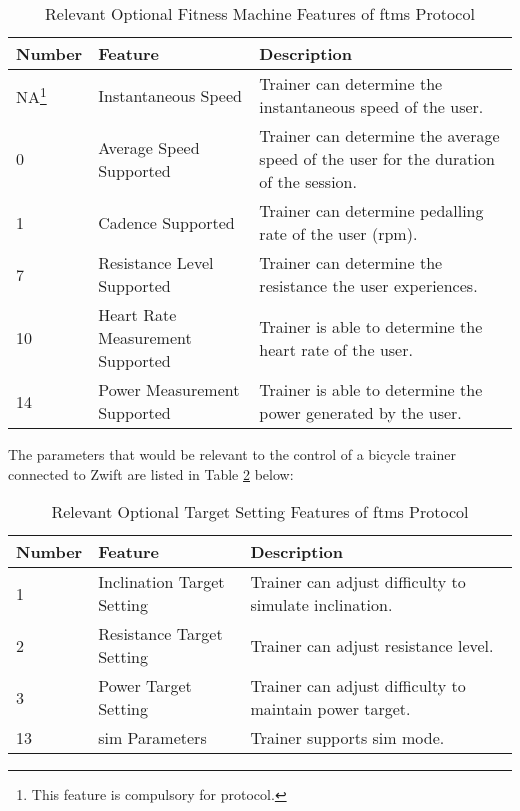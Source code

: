 \begin{minipage}{\textwidth}
	\begin{table}[H]
		\renewcommand{\arraystretch}{1.2}
		\centering
		\caption{Relevant Optional Fitness Machine Features of \ac{ftms} Protocol}
		\begin{tabularx}{\textwidth}{p{1.4cm} >{\raggedright}p{5cm} >{\raggedright\arraybackslash}X}
			\toprule
			Number & Feature & Description\\
			\midrule
			NA\footnote{This feature is compulsory for protocol.} & Instantaneous Speed & Trainer can determine the instantaneous speed of the user.\\
			0 & Average Speed Supported & Trainer can determine the average speed of the user for the duration of the session.\\
			1 & Cadence Supported & Trainer can determine pedalling rate of the user (rpm).\\
			7 & Resistance Level Supported & Trainer can determine the resistance the user experiences.\\
			10 & Heart Rate Measurement Supported & Trainer is able to determine the heart rate of the user.\\
			14 & Power Measurement Supported & Trainer is able to determine the power generated by the user.\\
			\bottomrule
		\end{tabularx}
		\label{tab:ftmsft}
	\end{table}
\end{minipage}

The parameters that would be relevant to the control of a bicycle trainer connected to Zwift are listed in Table \ref{tab:ftmstg} below:
\begin{table}[H]
	\renewcommand{\arraystretch}{1.2}
	\centering
	\caption{Relevant Optional Target Setting Features of \ac{ftms} Protocol}
	\begin{tabularx}{\textwidth}{p{1.4cm} >{\raggedright}p{5cm} >{\raggedright\arraybackslash}X}
		\toprule
		Number & Feature & Description\\
		\midrule
		1 & Inclination Target Setting & Trainer can adjust difficulty to simulate inclination.\\
		2 & Resistance Target Setting & Trainer can adjust resistance level.\\
		3 & Power Target Setting & Trainer can adjust difficulty to maintain power target.\\
		13 & \ac{sim} Parameters & Trainer supports \ac{sim} mode.\\
		\bottomrule
	\end{tabularx}
	\label{tab:ftmstg}
\end{table}

